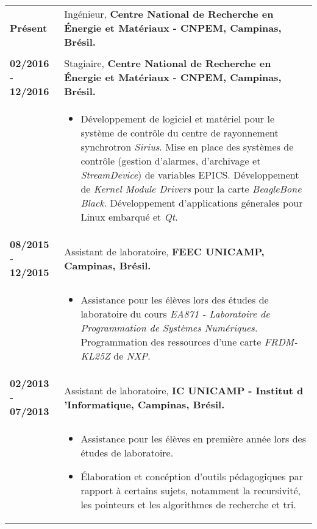 \documentclass[10pt, a4paper]{article}
\begin{document}
\begin{tabular}{p{} p{}}

\textbf{Présent}  & Ingénieur, \textbf{Centre National de
Recherche en Énergie et Matériaux - CNPEM, Campinas, Brésil.}
\\
& \vspace{-8pt}
\\

\textbf{02/2016 - 12/2016}  & Stagiaire, \textbf{Centre National de
Recherche en Énergie et Matériaux - CNPEM, Campinas, Brésil.}
 \\
  & \vspace{-8pt}
  \begin{itemize}
    \item Développement de logiciel et matériel pour le système
    de contrôle du centre de rayonnement synchrotron \textit{Sirius}.
    Mise en place des systèmes de contrôle (gestion d'alarmes, d'archivage et
    \textit{StreamDevice}) de variables EPICS. Développement de \textit{Kernel Module Drivers} pour la
    carte \textit{BeagleBone Black}. Développement d'applications
    génerales pour Linux embarqué et \textit{Qt}.
    
	\end{itemize}\\

\textbf{08/2015 - 12/2015}  & Assistant de laboratoire, \textbf{FEEC
 UNICAMP, Campinas, Brésil.}
 \\
 & \vspace{-8pt}
 \begin{itemize}
    \item Assistance pour les élèves lors des études de
    laboratoire du cours \textit{EA871 - Laboratoire de Programmation de
    Systèmes Numériques}. Programmation des ressources 
    d'une carte \textit{FRDM-KL25Z} de \textit{NXP}.
    
\end{itemize}\\

 \textbf{02/2013 - 07/2013}   & Assistant de laboratoire, \textbf{IC UNICAMP -
 Institut d 'Informatique, Campinas, Brésil.} \\
 & \vspace{-8pt}
 \begin{itemize}
    \item Assistance pour les élèves en première année lors des études de
    laboratoire.
    \item Élaboration et concéption d'outils pédagogiques par rapport
    à certains sujets, notamment la recursivité, les pointeurs et les
    algorithmes de recherche et  tri.
\end{itemize}\\


\end{tabular}
\end{document}
